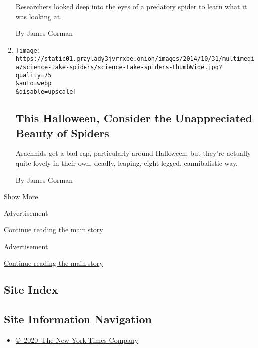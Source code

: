 \begin{enumerate}
  Researchers looked deep into the eyes of a predatory spider to learn
  what it was looking at.

  By James Gorman
\item
  \href{/2018/10/31/science/spiders-halloween.html}{}

  \texttt{[image: https://static01.graylady3jvrrxbe.onion/images/2014/10/31/multimedia/science-take-spiders/science-take-spiders-thumbWide.jpg?quality=75\\\&auto=webp\\\&disable=upscale]}

  \hypertarget{this-halloween-consider-the-unappreciated-beauty-of-spiders}{%
  \subsection{This Halloween, Consider the Unappreciated Beauty of
  Spiders}\label{this-halloween-consider-the-unappreciated-beauty-of-spiders}}

  Arachnids get a bad rap, particularly around Halloween, but they're
  actually quite lovely in their own, deadly, leaping, eight-legged,
  cannibalistic way.

  By James Gorman
\end{enumerate}

Show More

Advertisement

\protect\hyperlink{after-mid1}{Continue reading the main story}

Advertisement

\protect\hyperlink{after-mktg}{Continue reading the main story}

\hypertarget{site-index}{%
\subsection{Site Index}\label{site-index}}

\hypertarget{site-information-navigation}{%
\subsection{Site Information
Navigation}\label{site-information-navigation}}

\begin{itemize}
\tightlist
\item
  \href{https://help.nytimes3xbfgragh.onion/hc/en-us/articles/115014792127-Copyright-notice}{©~2020~The
  New York Times Company}
\end{itemize}

